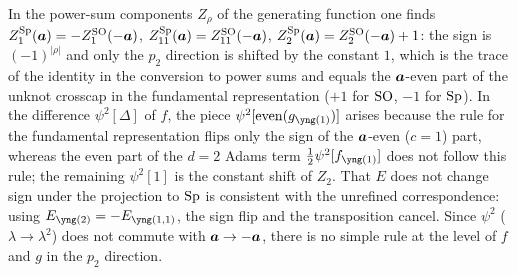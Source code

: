 \begin{remark}
In the power-sum components $Z_\rho$ of the generating function one finds $Z_1^{\mathrm{Sp}}(\bm{a}) = -Z_1^{\mathrm{SO}}(-\bm{a})$, $Z_{11}^{\mathrm{Sp}}(\bm{a}) = Z_{11}^{\mathrm{SO}}(-\bm{a})$, $Z_2^{\mathrm{Sp}}(\bm{a}) = Z_2^{\mathrm{SO}}(-\bm{a}) + 1$: the sign is $(-1)^{|\rho|}$ and only the $p_2$ direction is shifted by the constant $1$, which is the trace of the identity in the conversion to power sums and equals the $\bm{a}$-even part of the unknot crosscap in the fundamental representation ($+1$ for $\mathrm{SO}$, $-1$ for $\mathrm{Sp}$). In the difference $\psi^2[\Delta]$ of $f$, the piece $\psi^2[\mathrm{even}(g_{\yone})]$ arises because the rule for the fundamental representation flips only the sign of the $\bm{a}$-even ($c = 1$) part, whereas the even part of the $d = 2$ Adams term $\tfrac12\psi^2[f_{\yone}]$ does not follow this rule; the remaining $\psi^2[1]$ is the constant shift of $Z_2$. That $E$ does not change sign under the projection to $\mathrm{Sp}$ is consistent with the unrefined correspondence: using $E_{\ytwo} = -E_{\yoneone}$, the sign flip and the transposition cancel. Since $\psi^2$ ($\lambda \to \lambda^2$) does not commute with $\bm{a} \to -\bm{a}$, there is no simple rule at the level of $f$ and $g$ in the $p_2$ direction.
\end{remark}
